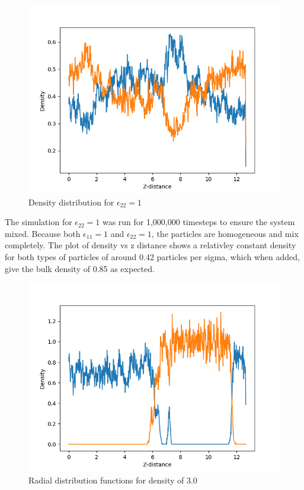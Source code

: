 \documentclass{article}
\begin{document}
		\begin{figure}[H]
				\centering
				\includegraphics[scale=0.5]{dens_eps1}
				\caption{Density distribution for $\epsilon _{22} = 1$}
		\end{figure}

		The simulation for $\epsilon _{22}=1$ was run for 1,000,000 timesteps to ensure the system mixed. Because both $\epsilon _{11}=1$ and $\epsilon _{22}=1$, the particles are homogeneous and mix completely. The plot of density vs z distance shows a relativley constant density for both types of particles of around 0.42 particles per sigma, which when added, give the bulk density of 0.85 as expected. 

		\begin{figure}[H]
				\centering
				\includegraphics[scale=0.5]{dens_eps3}
				\caption{Radial distribution functions for density of 3.0}
		\end{figure}
\end{document}
